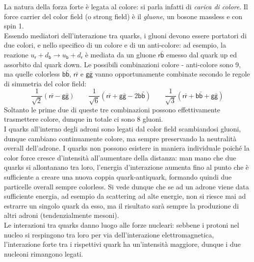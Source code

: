 La natura della forza forte è legata al colore: si parla infatti di \textit{carica di colore}. Il force carrier del color field (o strong field) è il \textit{gluone}, un bosone massless e con spin 1.\\
Essendo mediatori dell'interazione tra quarks, i gluoni devono essere portatori di due colori, e nello specifico di un colore e di un anti-colore: ad esempio, la reazione $ u_{\mathsf{r}} + d_{\mathsf{b}} \rightarrow u_{\mathsf{b}} + d_{\mathsf{r}} $ è mediata da un gluone $ \mathsf{r}\bar{\mathsf{b}} $ emesso dal quark up ed assorbito dal quark down. Le possibili combinazioni colore - anti-colore sono 9, ma quelle colorless $ \mathsf{b}\bar{\mathsf{b}} $, $ \mathsf{r}\bar{\mathsf{r}} $ e $ \mathsf{g}\bar{\mathsf{g}} $ vanno opportunamente combinate secondo le regole di simmetria del color field:
\begin{equation*}
	\frac{1}{\sqrt{2}} \left( \mathsf{r}\bar{\mathsf{r}} - \mathsf{g}\bar{\mathsf{g}} \right)
	\qquad
	\frac{1}{\sqrt{6}} \left( \mathsf{r}\bar{\mathsf{r}} + \mathsf{g}\bar{\mathsf{g}} - 2\mathsf{b}\bar{\mathsf{b}} \right)
	\qquad
	\frac{1}{\sqrt{3}} \left( \mathsf{r}\bar{\mathsf{r}} + \mathsf{b}\bar{\mathsf{b}} + \mathsf{g}\bar{\mathsf{g}} \right)
\end{equation*}
Soltanto le prime due di queste tre combinazioni possono effettivamente trasmettere colore, dunque in totale ci sono 8 gluoni.\\
I quarks all'interno degli adroni sono legati dal color field scambiandosi gluoni, dunque cambiano continuamente colore, ma sempre preservando la neutralità overall dell'adrone. I quarks non possono esistere in maniera individuale poiché la color force cresce d'intensità all'aumentare della distanza: man mano che due quarks si allontanano tra loro, l'energia d'interazione aumenta fino al punto che è sufficiente a creare una nuova coppia quark-antiquark, formando quindi due particelle overall sempre colorless. Si vede dunque che se ad un adrone viene data sufficiente energia, ad esempio da scattering ad alte energie, non si riesce mai ad estrarre un singolo quark da esso, ma il risultato sarà sempre la produzione di altri adroni (tendenzialmente mesoni).\\
Le interazioni tra quarks danno luogo alle forze nucleari: sebbene i protoni nel nucleo si respingono tra loro per via dell'interazione elettromagnetica, l'interazione forte tra i rispettivi quark ha un'intensità maggiore, dunque i due nucleoni rimangono legati.

